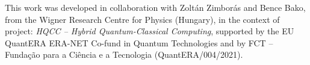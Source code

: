 \vspace*{\fill}

This work was developed in collaboration with Zoltán Zimborás and Bence Bako, from the Wigner Research Centre for Physics (Hungary), in the context of project: \textit{HQCC – Hybrid Quantum-Classical Computing}, supported by the EU QuantERA ERA-NET Co-fund in Quantum Technologies and by FCT -- Funda\c{c}\~{a}o para a Ci\^{e}ncia e a Tecnologia (QuantERA/004/2021).

